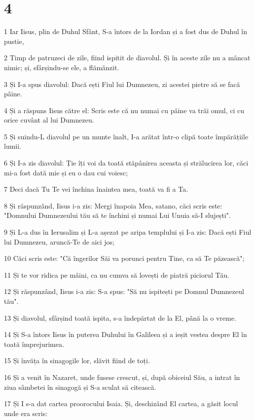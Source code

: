 \chapter{4}

\par 1 Iar Iisus, plin de Duhul Sfânt, S-a întors de la Iordan și a fost dus de Duhul în pustie,
\par 2 Timp de patruzeci de zile, fiind ispitit de diavolul. Și în aceste zile nu a mâncat nimic; și, sfârșindu-se ele, a flămânzit.
\par 3 Și I-a spus diavolul: Dacă ești Fiul lui Dumnezeu, zi acestei pietre să se facă pâine.
\par 4 Și a răspuns Iisus către el: Scris este că nu numai cu pâine va trăi omul, ci cu orice cuvânt al lui Dumnezeu.
\par 5 Și suindu-L diavolul pe un munte înalt, I-a arătat într-o clipă toate împărățiile lumii.
\par 6 Și I-a zis diavolul: Ție îți voi da toată stăpânirea aceasta și strălucirea lor, căci mi-a fost dată mie și eu o dau cui voiesc;
\par 7 Deci dacă Tu Te vei închina înaintea mea, toată va fi a Ta.
\par 8 Și răspunzând, Iisus i-a zis: Mergi înapoia Mea, satano, căci scris este: "Domnului Dumnezeului tău să te închini și numai Lui Unuia să-I slujești".
\par 9 Și L-a dus în Ierusalim și L-a așezat pe aripa templului și I-a zis: Dacă ești Fiul lui Dumnezeu, aruncă-Te de aici jos;
\par 10 Căci scris este: "Că îngerilor Săi va porunci pentru Tine, ca să Te păzească";
\par 11 Și te vor ridica pe mâini, ca nu cumva să lovești de piatră piciorul Tău.
\par 12 Și răspunzând, Iisus i-a zis: S-a spus: "Să nu ispitești pe Domnul Dumnezeul tău".
\par 13 Și diavolul, sfârșind toată ispita, s-a îndepărtat de la El, până la o vreme.
\par 14 Și S-a întors Iisus în puterea Duhului în Galileea și a ieșit vestea despre El în toată împrejurimea.
\par 15 Și învăța în sinagogile lor, slăvit fiind de toți.
\par 16 Și a venit în Nazaret, unde fusese crescut, și, după obiceiul Său, a intrat în ziua sâmbetei în sinagogă și S-a sculat să citească.
\par 17 Și I s-a dat cartea proorocului Isaia. Și, deschizând El cartea, a găsit locul unde era scris:
